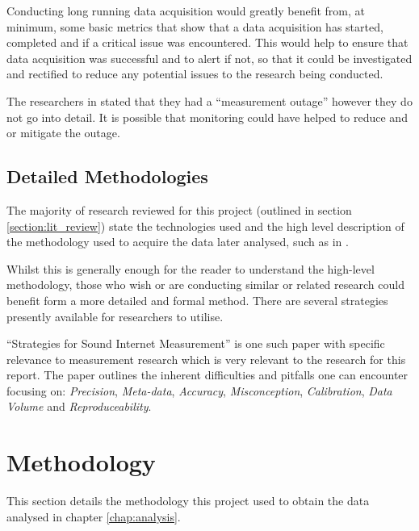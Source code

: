 \documentclass{mscreport}
\begin{document}
Conducting long running data acquisition would greatly benefit from, at minimum, some basic metrics that show that a data acquisition has started, completed and if a critical issue was encountered. This would help to ensure that data acquisition was successful and to alert if not, so that it could be investigated and rectified to reduce any potential issues to the research being conducted.

\vspace{0.3cm} \noindent
The researchers in \cite{Poteat2021-zr} stated that they had a ``measurement outage'' however they do not go into detail. It is possible that monitoring could have helped to reduce and or mitigate the outage.

\subsection{Detailed Methodologies}

The majority of research reviewed for this project (outlined in section \ref{section:lit_review}) state the technologies used and the high level description of the methodology used to acquire the data later analysed, such as in \cite{Amann2017-co,Chen2016-dl,Van_Goethem2014-ao}.

\vspace{0.3cm} \noindent
Whilst this is generally enough for the reader to understand the high-level methodology, those who wish or are conducting similar or related research could benefit form a more detailed and formal method. There are several strategies presently available for researchers to utilise.

\vspace{0.3cm} \noindent
``Strategies for Sound Internet Measurement'' \cite{Paxson2004-hq} is one such paper with specific relevance to measurement research which is very relevant to the research for this report. The paper outlines the inherent difficulties and pitfalls one can encounter focusing on: \textit{Precision}, \textit{Meta-data}, \textit{Accuracy}, \textit{Misconception}, \textit{Calibration}, \textit{Data Volume} and  \textit{Reproduceability}.


\section{Methodology}
\label{section:methodology}

This section details the methodology this project used to obtain the data analysed in chapter \ref{chap:analysis}.
\end{document}

